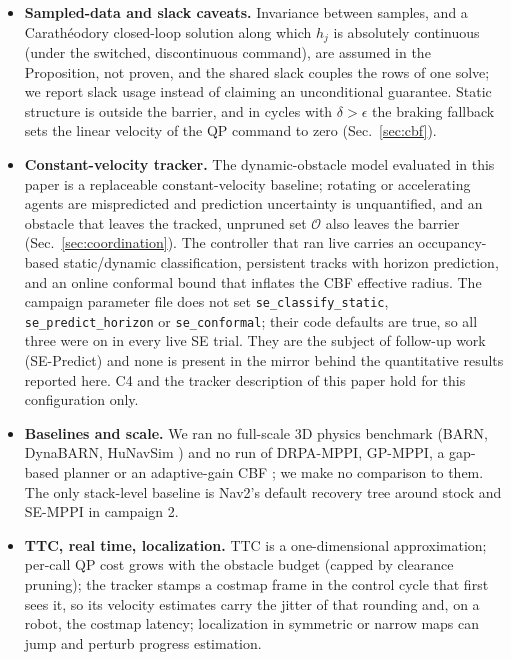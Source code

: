\documentclass[journal]{IEEEtran}
\begin{document}
\begin{itemize}
  Sec.~\ref{sec:coordination} concerns the look-ahead point $P$, not the full robot body. Body safety is
  therefore \textbf{approximate}: the offset $L\approx r$ places $P$ at the robot's leading edge, and the
  costmap obstacle critic covers the residual; in the live campaign no \texttt{collision\_monitor}
  zone was active, so it covered nothing. A full-body guarantee
  would require inflating the margin by $L$, which we avoid because it over-constrains sub-meter gaps and
  would degrade the success rate. On the \texttt{dynamic} family the look-ahead filter left body-grazing
  collisions essentially unchanged ($20\%\!\to\!16\%$, descriptive).
\item \textbf{Sampled-data and slack caveats.} Invariance between samples, and a Carath\'eodory closed-loop solution along which $h_j$ is absolutely continuous
  (under the switched, discontinuous command), are assumed in the Proposition,
  not proven, and the shared slack couples the rows of one solve; we report slack usage instead of
  claiming an unconditional guarantee. Static structure is outside the barrier, and in cycles with
  $\delta>\epsilon$ the braking fallback sets the linear velocity of the QP command to zero
  (Sec.~\ref{sec:cbf}).
\item \textbf{Constant-velocity tracker.} The dynamic-obstacle model evaluated in this paper is a
  replaceable constant-velocity baseline; rotating or accelerating agents are mispredicted and prediction
  uncertainty is unquantified, and an obstacle that leaves the tracked, unpruned set $\mathcal{O}$ also
  leaves the barrier (Sec.~\ref{sec:coordination}). The controller that ran live carries an occupancy-based
  static/dynamic classification, persistent tracks with horizon prediction, and an online conformal bound
  that inflates the CBF effective radius. The campaign parameter file does not set
  \texttt{se\_classify\_static}, \texttt{se\_predict\_horizon} or \texttt{se\_conformal}; their code
  defaults are true, so all three were on in every live SE trial. They are the subject of follow-up work
  (SE-Predict) and none is present in the mirror behind the quantitative results reported here. C4 and the
  tracker description of this paper hold for this configuration only.
\item \textbf{Baselines and scale.} We ran no full-scale 3D physics benchmark (BARN, DynaBARN, HuNavSim \cite{barn,dynabarn,hunavsim})
  and no run of DRPA-MPPI, GP-MPPI, a gap-based planner or an adaptive-gain CBF
  \cite{drpa_mppi,gp_mppi,safer_gap,kim_adaptive_cbf}; we make no comparison to them. The only
  stack-level baseline is Nav2's default recovery tree around stock and SE-MPPI in campaign 2.
\item \textbf{TTC, real time, localization.} TTC is a one-dimensional approximation; per-call QP cost grows
  with the obstacle budget (capped by clearance pruning); the tracker stamps a costmap frame in the
  control cycle that first sees it, so its velocity estimates carry the jitter of that rounding and, on a
  robot, the costmap latency; localization in symmetric or narrow maps can jump
  and perturb progress estimation.
\end{itemize}
\end{document}
